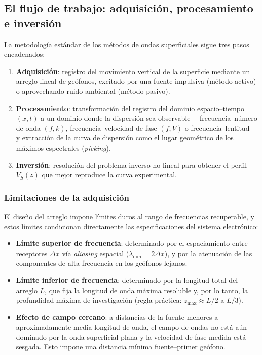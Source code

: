 \subsection{El flujo de trabajo: adquisici\'on, procesamiento e inversi\'on}

La metodolog\'ia est\'andar de los m\'etodos de ondas superficiales sigue tres pasos
encadenados:

\begin{enumerate}[itemsep=0.15em]
    \item \textbf{Adquisici\'on}: registro del movimiento vertical de la superficie
    mediante un arreglo lineal de ge\'ofonos, excitado por una fuente impulsiva
    (m\'etodo activo) o aprovechando ruido ambiental (m\'etodo pasivo).
    \item \textbf{Procesamiento}: transformaci\'on del registro del dominio
    espacio--tiempo $(x,t)$ a un dominio donde la dispersi\'on sea observable
    ---frecuencia--n\'umero de onda $(f,k)$, frecuencia--velocidad de fase $(f,V)$ o
    frecuencia--lentitud--- y extracci\'on de la curva de dispersi\'on como el lugar
    geom\'etrico de los m\'aximos espectrales (\emph{picking}).
    \item \textbf{Inversi\'on}: resoluci\'on del problema inverso no lineal para obtener
    el perfil $V_S(z)$ que mejor reproduce la curva experimental.
\end{enumerate}

\subsubsection{Limitaciones de la adquisici\'on}

El dise\~no del arreglo impone l\'imites duros al rango de frecuencias recuperable, y estos
l\'imites condicionan directamente las especificaciones del sistema electr\'onico:

\begin{itemize}[itemsep=0.15em]
    \item \textbf{L\'imite superior de frecuencia}: determinado por el espaciamiento
    entre receptores $\Delta x$ v\'ia \emph{aliasing} espacial ($\lambda_{\min}=2\Delta x$),
    y por la atenuaci\'on de las componentes de alta frecuencia en los ge\'ofonos lejanos.
    \item \textbf{L\'imite inferior de frecuencia}: determinado por la longitud total
    del arreglo $L$, que fija la longitud de onda m\'axima resoluble y, por lo tanto, la
    profundidad m\'axima de investigaci\'on (regla pr\'actica: $z_{\max}\approx L/2$ a $L/3$).
    \item \textbf{Efecto de campo cercano}: a distancias de la fuente menores a
    aproximadamente media longitud de onda, el campo de ondas no est\'a a\'un dominado por
    la onda superficial plana y la velocidad de fase medida est\'a sesgada. Esto impone
    una distancia m\'inima fuente--primer ge\'ofono.
\end{itemize}

